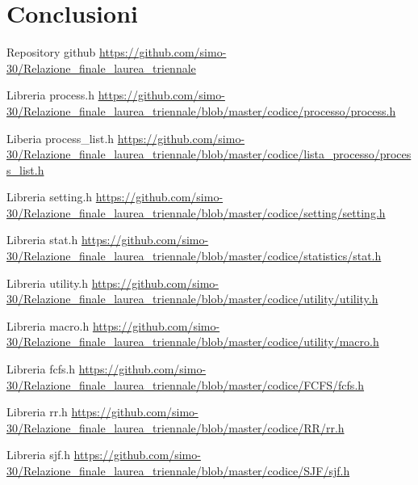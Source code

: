 \documentclass[Lau, oneside]{sapthesis}%
\begin{document}
\chapter{Conclusioni}
\label{chap:4}

\backmatter
{}
\begin{thebibliography}{17}

\label{ref:repo}
Repository github \url{https://github.com/simo-30/Relazione_finale_laurea_triennale}

\label{ref:proch}
Libreria process.h \url{https://github.com/simo-30/Relazione_finale_laurea_triennale/blob/master/codice/processo/process.h}

\label{ref:listproch}
Liberia process\_list.h \url{https://github.com/simo-30/Relazione_finale_laurea_triennale/blob/master/codice/lista_processo/process_list.h}

\label{ref:settingh}
Libreria setting.h \url{https://github.com/simo-30/Relazione_finale_laurea_triennale/blob/master/codice/setting/setting.h}

\label{ref:stath}
Libreria stat.h \url{https://github.com/simo-30/Relazione_finale_laurea_triennale/blob/master/codice/statistics/stat.h}

\label{ref:utilityh}
Libreria utility.h \url{https://github.com/simo-30/Relazione_finale_laurea_triennale/blob/master/codice/utility/utility.h}

\label{ref:macroh}
Libreria macro.h \url{https://github.com/simo-30/Relazione_finale_laurea_triennale/blob/master/codice/utility/macro.h}

\label{ref:fcfsh}
Libreria fcfs.h \url{https://github.com/simo-30/Relazione_finale_laurea_triennale/blob/master/codice/FCFS/fcfs.h}

\label{ref:rrh}
Libreria rr.h \url{https://github.com/simo-30/Relazione_finale_laurea_triennale/blob/master/codice/RR/rr.h}

\label{ref:sjfh}
Libreria sjf.h \url{https://github.com/simo-30/Relazione_finale_laurea_triennale/blob/master/codice/SJF/sjf.h}

\end{thebibliography}
\end{document}
